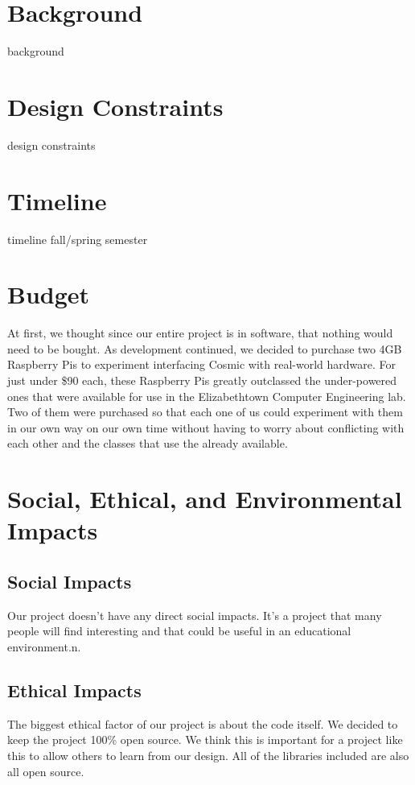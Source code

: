 \documentclass[conference]{IEEEtran}
\begin{document}
\section{Background}
background


\section{Design Constraints}
design constraints


\section{Timeline}
timeline fall/spring semester


\section{Budget}
At first, we thought since our entire project is in software, that nothing would need to be bought. As development continued, we decided to purchase two 4GB Raspberry Pis to experiment interfacing Cosmic with real-world hardware. For just under \$90 each, these Raspberry Pis greatly outclassed the under-powered ones that were available for use in the Elizabethtown Computer Engineering lab. Two of them were purchased so that each one of us could experiment with them in our own way on our own time without having to worry about conflicting with each other and the classes that use the already available.


\section{Social, Ethical, and Environmental Impacts}

\subsection{Social Impacts}
Our project doesn't have any direct social impacts. It's a project that many people will find interesting and that could be useful in an educational environment.n.

\subsection{Ethical Impacts}
The biggest ethical factor of our project is about the code itself. We decided to keep the project 100\% open source. We think this is important for a project like this to allow others to learn from our design. All of the libraries included are also all open source.
\end{document}
